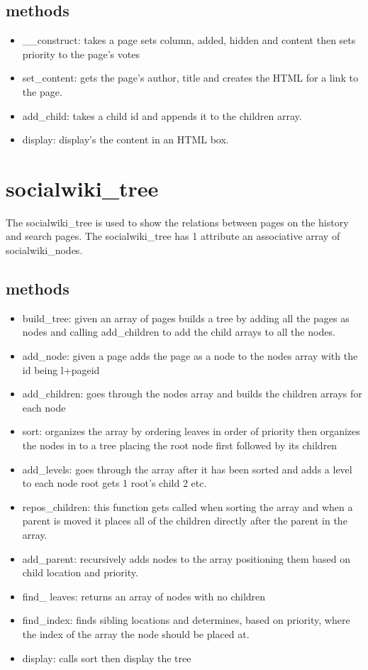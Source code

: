 \documentclass[letterpaper,twoside,12pt]{report}
\begin{document}
\subsection{methods}
	\begin{itemize}
		\item \_\_construct: takes a page sets column, added, hidden and content then sets priority to the page's votes
		\item set\_content: gets the page's author, title and creates the HTML for a link to the page.
		\item add\_child: takes a child id and appends it to the children array.
		\item display: display's the content in an HTML box.
	\end{itemize}



\section{socialwiki\_tree}
The socialwiki\_tree is used to show the relations between pages on the history and search pages.
The socialwiki\_tree has 1 attribute an associative array of socialwiki\_nodes.
	\subsection{methods}
		\begin{itemize}
			\item build\_tree: given an array of pages builds a tree by adding all the pages as nodes and calling add\_children to add the child arrays to all the nodes.
			\item add\_node: given a page adds the page as a node to the nodes array with the id being l+pageid
			\item add\_children: goes through the nodes array and builds the children arrays for each node
			\item sort: organizes the array by ordering leaves in order of priority then organizes the nodes in to a tree placing the root node first followed by its children
			\item add\_levels: goes through the array after it has been sorted and adds a level to each node root gets 1 root's child 2 etc.
			\item repos\_children: this function gets called when sorting the array and when a parent is moved it places all of the children directly after the parent in the array.
			\item add\_parent: recursively adds nodes to the array positioning them based on child location and priority.
			\item find\_ leaves: returns an array of nodes with no children
			\item find\_index: finds sibling locations and determines, based on priority, where the index of the array the node should be placed at.
			\item display: calls sort then display the tree
		\end{itemize}
\end{document}
